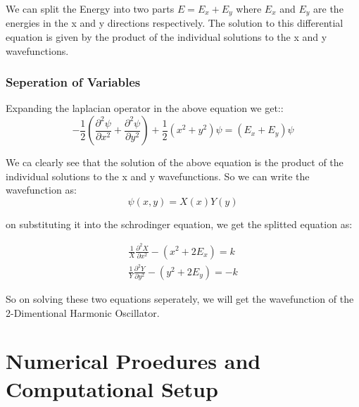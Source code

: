 \documentclass{article}
\begin{document}
\begin{multicols}{2}
We can split the Energy into two parts $E = E_x + E_y$ where $E_x$ and $E_y$ are the energies in the x and y directions respectively. The solution to this differential equation is given by the product of the individual solutions to the x and y wavefunctions.

\subsubsection{Seperation of Variables}

Expanding the laplacian operator in the above equation we get::
\begin{equation}
    -\frac{1}{2}(\frac{\partial^2\psi}{\partial x^2} + \frac{\partial^2\psi}{\partial y^2}) + \frac{1}{2}(x^2 + y^2)\psi = (E_x + E_y)\psi
\end{equation}



We ca clearly see that the solution of the above equation is the product of the individual solutions to the x and y wavefunctions. So we can write the wavefunction as:
\begin{equation}
    \psi(x,y) = X(x)Y(y)
\end{equation}

on substituting it into the schrodinger equation, we get the splitted equation as:

\begin{eqnarray}
    \frac{1}{X}\frac{\partial^2 X}{\partial x^2} - (x^2 + 2E_x) = k\\
    \frac{1}{Y}\frac{\partial^2 Y}{\partial y^2} - (y^2 + 2E_y) = -k
\end{eqnarray}

So on solving these two equations seperately, we will get the wavefunction of the 2-Dimentional Harmonic Oscillator.

\section{\label{expsetup}Numerical Proedures and Computational Setup}


\end{multicols}
\end{document}
